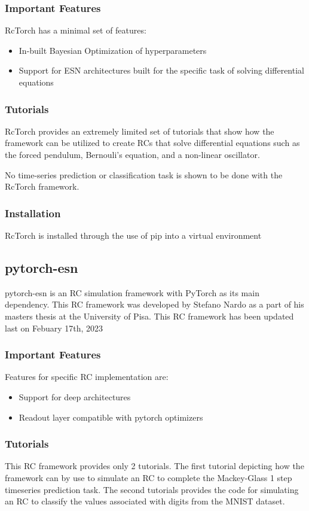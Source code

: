 \documentclass[a4paper,fleqn]{cas-dc}
\begin{document}
\subsubsection{Important Features}
RcTorch has a minimal set of features:

\begin{itemize}
    \item In-built Bayesian Optimization of hyperparameters
    \item Support for ESN architectures built for the specific task of solving differential equations
\end{itemize}
\subsubsection{Tutorials}
RcTorch provides an extremely limited set of tutorials that show how the framework can be utilized to create RCs that solve differential equations such as the forced pendulum, Bernouli's equation, and a non-linear oscillator.

No time-series prediction or classification task is shown to be done with the RcTorch framework.
\subsubsection{Installation}
RcTorch is installed through the use of pip into a virtual environment


\subsection{pytorch-esn}
pytorch-esn is an RC simulation framework with PyTorch as its main dependency. This RC framework was developed by Stefano Nardo as a part of his masters thesis at the University of Pisa. This RC framework has been updated last on Febuary 17th, 2023

\subsubsection{Important Features}
Features for specific RC implementation are:
\begin{itemize}
    \item Support for deep architectures
    \item Readout layer compatible with pytorch optimizers
\end{itemize}
\subsubsection{Tutorials}
This RC framework provides only 2 tutorials. The first tutorial depicting how the framework can by use to simulate an RC to complete the Mackey-Glass 1 step timeseries prediction task. The second tutorials provides the code for simulating an RC to classify the values associated with digits from the MNIST dataset.
\end{document}
